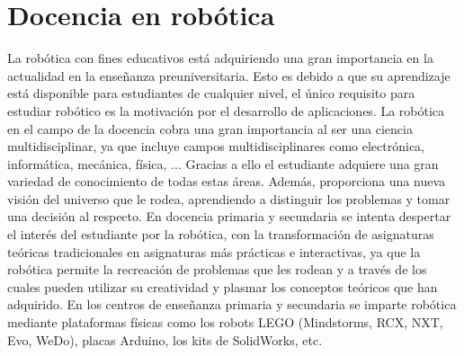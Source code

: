 \section{Docencia en robótica}
La robótica con fines educativos está adquiriendo una gran importancia en la actualidad en la enseñanza preuniversitaria. Esto es debido a que su aprendizaje está disponible para estudiantes de cualquier nivel, el único requisito para estudiar robótico es la motivación por el desarrollo de aplicaciones. La robótica en el campo de la docencia cobra una gran importancia al ser una ciencia multidisciplinar, ya que incluye campos multidisciplinares como electrónica, informática, mecánica, física, ... Gracias a ello el estudiante adquiere una gran variedad de conocimiento de todas estas áreas. Además, proporciona una nueva visión del universo que le rodea, aprendiendo a distinguir los problemas y tomar una decisión al respecto.
En docencia primaria y secundaria se intenta despertar el interés del estudiante por la robótica, con la transformación de asignaturas teóricas tradicionales en asignaturas más prácticas e interactivas, ya que la robótica permite la recreación de problemas que les rodean y a través de los cuales pueden utilizar su creatividad y plasmar los conceptos teóricos que han adquirido.
En los centros de enseñanza primaria y secundaria se imparte robótica mediante plataformas físicas como los robots LEGO (Mindstorms, RCX, NXT, Evo, WeDo), placas Arduino, los kits de SolidWorks, etc.

